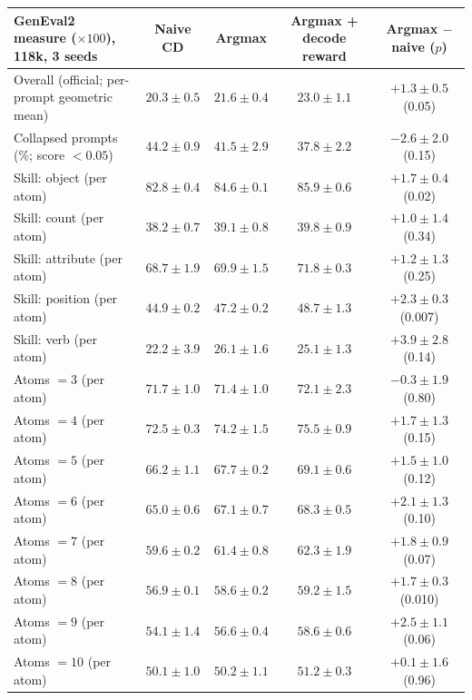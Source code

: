 \begin{tabular}{l c c c c}
\toprule
GenEval2 measure ($\times100$), 118k, 3 seeds & Naive CD & Argmax & Argmax + decode reward & Argmax $-$ naive ($p$) \\
\midrule
Overall (official; per-prompt geometric mean) & $20.3\pm0.5$ & $21.6\pm0.4$ & $23.0\pm1.1$ & $+1.3\pm0.5$ (0.05) \\
Collapsed prompts (\%; score $<0.05$) & $44.2\pm0.9$ & $41.5\pm2.9$ & $37.8\pm2.2$ & $-2.6\pm2.0$ (0.15) \\
\midrule
Skill: object (per atom) & $82.8\pm0.4$ & $84.6\pm0.1$ & $85.9\pm0.6$ & $+1.7\pm0.4$ (0.02) \\
Skill: count (per atom) & $38.2\pm0.7$ & $39.1\pm0.8$ & $39.8\pm0.9$ & $+1.0\pm1.4$ (0.34) \\
Skill: attribute (per atom) & $68.7\pm1.9$ & $69.9\pm1.5$ & $71.8\pm0.3$ & $+1.2\pm1.3$ (0.25) \\
Skill: position (per atom) & $44.9\pm0.2$ & $47.2\pm0.2$ & $48.7\pm1.3$ & $+2.3\pm0.3$ (0.007) \\
Skill: verb (per atom) & $22.2\pm3.9$ & $26.1\pm1.6$ & $25.1\pm1.3$ & $+3.9\pm2.8$ (0.14) \\
\midrule
Atoms $=3$ (per atom) & $71.7\pm1.0$ & $71.4\pm1.0$ & $72.1\pm2.3$ & $-0.3\pm1.9$ (0.80) \\
Atoms $=4$ (per atom) & $72.5\pm0.3$ & $74.2\pm1.5$ & $75.5\pm0.9$ & $+1.7\pm1.3$ (0.15) \\
Atoms $=5$ (per atom) & $66.2\pm1.1$ & $67.7\pm0.2$ & $69.1\pm0.6$ & $+1.5\pm1.0$ (0.12) \\
Atoms $=6$ (per atom) & $65.0\pm0.6$ & $67.1\pm0.7$ & $68.3\pm0.5$ & $+2.1\pm1.3$ (0.10) \\
Atoms $=7$ (per atom) & $59.6\pm0.2$ & $61.4\pm0.8$ & $62.3\pm1.9$ & $+1.8\pm0.9$ (0.07) \\
Atoms $=8$ (per atom) & $56.9\pm0.1$ & $58.6\pm0.2$ & $59.2\pm1.5$ & $+1.7\pm0.3$ (0.010) \\
Atoms $=9$ (per atom) & $54.1\pm1.4$ & $56.6\pm0.4$ & $58.6\pm0.6$ & $+2.5\pm1.1$ (0.06) \\
Atoms $=10$ (per atom) & $50.1\pm1.0$ & $50.2\pm1.1$ & $51.2\pm0.3$ & $+0.1\pm1.6$ (0.96) \\
\bottomrule
\end{tabular}